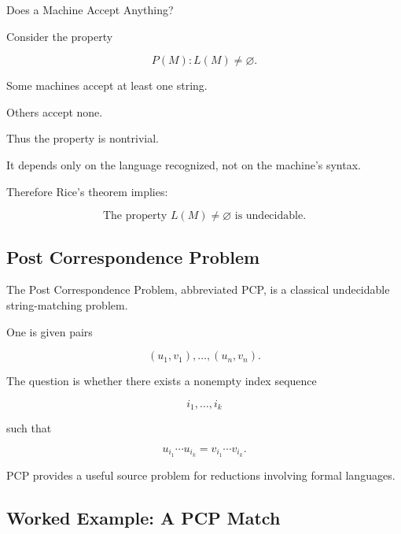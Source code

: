 \begin{workedexamplebox}{Does a Machine Accept Anything?}

Consider the property

\[
P(M):
L(M)\neq\varnothing.
\]

Some machines accept at least one string.

Others accept none.

Thus the property is nontrivial.

It depends only on the language recognized, not on the machine's syntax.

Therefore Rice's theorem implies:

\begin{answerbox}
\[
\boxed{
\text{The property }L(M)\neq\varnothing
\text{ is undecidable}.
}
\]
\end{answerbox}

\end{workedexamplebox}

\subsection{Post Correspondence Problem}
\label{subsec:post-correspondence-problem}

The Post Correspondence Problem, abbreviated PCP, is a classical
undecidable string-matching problem.

One is given pairs

\[
\boxed{
(u_1,v_1),
\ldots,
(u_n,v_n).
}
\]

The question is whether there exists a nonempty index sequence

\[
i_1,\ldots,i_k
\]

such that

\[
\boxed{
u_{i_1}\cdots u_{i_k}
=
v_{i_1}\cdots v_{i_k}.
}
\]

PCP provides a useful source problem for reductions involving formal
languages.

\subsection{Worked Example: A PCP Match}
\label{subsec:worked-pcp}

